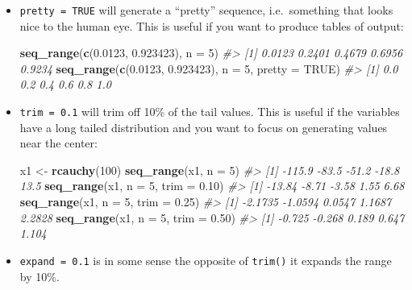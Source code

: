 \documentclass[]{book}
\newenvironment{Shaded}{\begin{snugshade}}{\end{snugshade}}
\newcommand{\KeywordTok}[1]{\textcolor[rgb]{0.13,0.29,0.53}{\textbf{{#1}}}}
\newcommand{\DataTypeTok}[1]{\textcolor[rgb]{0.13,0.29,0.53}{{#1}}}
\newcommand{\DecValTok}[1]{\textcolor[rgb]{0.00,0.00,0.81}{{#1}}}
\newcommand{\FloatTok}[1]{\textcolor[rgb]{0.00,0.00,0.81}{{#1}}}
\newcommand{\StringTok}[1]{\textcolor[rgb]{0.31,0.60,0.02}{{#1}}}
\newcommand{\CommentTok}[1]{\textcolor[rgb]{0.56,0.35,0.01}{\textit{{#1}}}}
\newcommand{\OtherTok}[1]{\textcolor[rgb]{0.56,0.35,0.01}{{#1}}}
\newcommand{\NormalTok}[1]{{#1}}
\begin{document}
\begin{itemize}
\item
  \texttt{pretty\ =\ TRUE} will generate a ``pretty'' sequence,
  i.e.~something that looks nice to the human eye. This is useful if you
  want to produce tables of output:

\begin{Shaded}
\begin{Highlighting}[]
\KeywordTok{seq_range}\NormalTok{(}\KeywordTok{c}\NormalTok{(}\FloatTok{0.0123}\NormalTok{, }\FloatTok{0.923423}\NormalTok{), }\DataTypeTok{n =} \DecValTok{5}\NormalTok{)}
\CommentTok{#> [1] 0.0123 0.2401 0.4679 0.6956 0.9234}
\KeywordTok{seq_range}\NormalTok{(}\KeywordTok{c}\NormalTok{(}\FloatTok{0.0123}\NormalTok{, }\FloatTok{0.923423}\NormalTok{), }\DataTypeTok{n =} \DecValTok{5}\NormalTok{, }\DataTypeTok{pretty =} \OtherTok{TRUE}\NormalTok{)}
\CommentTok{#> [1] 0.0 0.2 0.4 0.6 0.8 1.0}
\end{Highlighting}
\end{Shaded}
\item
  \texttt{trim\ =\ 0.1} will trim off 10\% of the tail values. This is
  useful if the variables have a long tailed distribution and you want
  to focus on generating values near the center:

\begin{Shaded}
\begin{Highlighting}[]
\NormalTok{x1 <-}\StringTok{ }\KeywordTok{rcauchy}\NormalTok{(}\DecValTok{100}\NormalTok{)}
\KeywordTok{seq_range}\NormalTok{(x1, }\DataTypeTok{n =} \DecValTok{5}\NormalTok{)}
\CommentTok{#> [1] -115.9  -83.5  -51.2  -18.8   13.5}
\KeywordTok{seq_range}\NormalTok{(x1, }\DataTypeTok{n =} \DecValTok{5}\NormalTok{, }\DataTypeTok{trim =} \FloatTok{0.10}\NormalTok{)}
\CommentTok{#> [1] -13.84  -8.71  -3.58   1.55   6.68}
\KeywordTok{seq_range}\NormalTok{(x1, }\DataTypeTok{n =} \DecValTok{5}\NormalTok{, }\DataTypeTok{trim =} \FloatTok{0.25}\NormalTok{)}
\CommentTok{#> [1] -2.1735 -1.0594  0.0547  1.1687  2.2828}
\KeywordTok{seq_range}\NormalTok{(x1, }\DataTypeTok{n =} \DecValTok{5}\NormalTok{, }\DataTypeTok{trim =} \FloatTok{0.50}\NormalTok{)}
\CommentTok{#> [1] -0.725 -0.268  0.189  0.647  1.104}
\end{Highlighting}
\end{Shaded}
\item
  \texttt{expand\ =\ 0.1} is in some sense the opposite of
  \texttt{trim()} it expands the range by 10\%.


\end{itemize}
\end{document}
